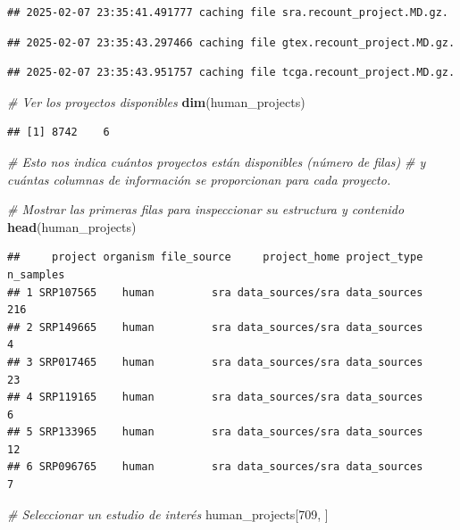 \documentclass[
]{article}
\newenvironment{Shaded}{\begin{snugshade}}{\end{snugshade}}
\newcommand{\CommentTok}[1]{\textcolor[rgb]{0.56,0.35,0.01}{\textit{#1}}}
\newcommand{\DecValTok}[1]{\textcolor[rgb]{0.00,0.00,0.81}{#1}}
\newcommand{\FunctionTok}[1]{\textcolor[rgb]{0.13,0.29,0.53}{\textbf{#1}}}
\newcommand{\NormalTok}[1]{#1}
\begin{document}
\begin{verbatim}
## 2025-02-07 23:35:41.491777 caching file sra.recount_project.MD.gz.
\end{verbatim}

\begin{verbatim}
## 2025-02-07 23:35:43.297466 caching file gtex.recount_project.MD.gz.
\end{verbatim}

\begin{verbatim}
## 2025-02-07 23:35:43.951757 caching file tcga.recount_project.MD.gz.
\end{verbatim}

\begin{Shaded}
\begin{Highlighting}[]
\CommentTok{\# Ver los proyectos disponibles}
\FunctionTok{dim}\NormalTok{(human\_projects)}
\end{Highlighting}
\end{Shaded}

\begin{verbatim}
## [1] 8742    6
\end{verbatim}

\begin{Shaded}
\begin{Highlighting}[]
\CommentTok{\# Esto nos indica cuántos proyectos están disponibles (número de filas) }
\CommentTok{\# y cuántas columnas de información se proporcionan para cada proyecto.}

\CommentTok{\# Mostrar las primeras filas para inspeccionar su estructura y contenido}
\FunctionTok{head}\NormalTok{(human\_projects)}
\end{Highlighting}
\end{Shaded}

\begin{verbatim}
##     project organism file_source     project_home project_type n_samples
## 1 SRP107565    human         sra data_sources/sra data_sources       216
## 2 SRP149665    human         sra data_sources/sra data_sources         4
## 3 SRP017465    human         sra data_sources/sra data_sources        23
## 4 SRP119165    human         sra data_sources/sra data_sources         6
## 5 SRP133965    human         sra data_sources/sra data_sources        12
## 6 SRP096765    human         sra data_sources/sra data_sources         7
\end{verbatim}

\begin{Shaded}
\begin{Highlighting}[]
\CommentTok{\# Seleccionar un estudio de interés}
\NormalTok{human\_projects[}\DecValTok{709}\NormalTok{, ]}
\end{Highlighting}
\end{Shaded}
\end{document}
